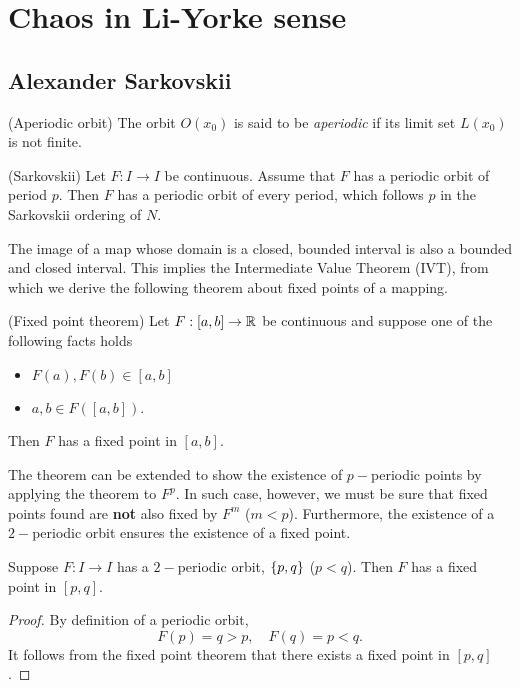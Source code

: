 \documentclass[11pt]{article}
\begin{document}
\section{Chaos in Li-Yorke sense}

\subsection{Alexander Sarkovskii}
\begin{definition}
  (Aperiodic orbit)
  The orbit $O(x_0)$ is said to be \textit{aperiodic} if its limit set $L(x_0)$ is not finite.
\end{definition}

\begin{proposition}
  (Sarkovskii)
  Let $F: I\to I$ be continuous. Assume that $F$ has a periodic orbit of period $p$.
  Then $F$ has a periodic orbit of every period, which follows $p$ in the Sarkovskii
  ordering of $N$.
\end{proposition}

The image of a map whose domain is a closed, bounded interval is also a bounded and closed interval.
This implies the Intermediate Value Theorem (IVT), from which we derive the following theorem about
fixed points of a mapping.
\begin{proposition}
  (Fixed point theorem)
  Let $F: [a,b] \to \mathbb{R}$ be continuous and suppose one of the following facts holds
  \begin{itemize}
    \item $F(a), F(b)\in [a,b]$
    \item $a, b\in F([a,b])$.
  \end{itemize}
  Then $F$ has a fixed point in $[a,b]$.
\end{proposition}

The theorem can be extended to show the existence of $p-$periodic points by applying the theorem to
$F^p$. In such case, however, we must be sure that fixed points found are \textbf{not} also fixed by
$F^m$ ($m < p$).
Furthermore, the existence of a $2-$periodic orbit ensures the existence of a fixed point.
\begin{proposition}
  Suppose $F: I\to I$ has a $2-$periodic orbit, $\{p,q\}$ ($p<q$). Then $F$ has a fixed point in $[p,q]$.
\end{proposition}
\begin{proof}
  By definition of a periodic orbit, 
  \begin{equation*}
    F(p) = q > p, \quad F(q) = p < q.
  \end{equation*}
  It follows from the fixed point theorem that there exists a fixed point in $[p,q]$.
\end{proof}
\end{document}
